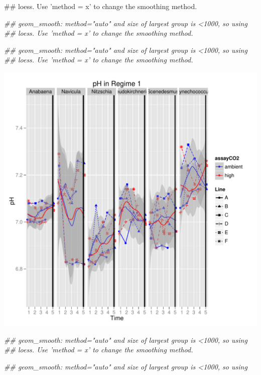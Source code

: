 \documentclass{article}\usepackage{graphicx, color}
\makeatletter
\def\maxwidth{ %
  \ifdim\Gin@nat@width>\linewidth
    \linewidth
  \else
    \Gin@nat@width
  \fi
}
\newenvironment{kframe}{%
 \def\at@end@of@kframe{}%
 \ifinner\ifhmode%
  \def\at@end@of@kframe{\end{minipage}}%
  \begin{minipage}{\columnwidth}%
 \fi\fi%
 \def\FrameCommand##1{\hskip\@totalleftmargin \hskip-\fboxsep
 \colorbox{shadecolor}{##1}\hskip-\fboxsep
     \hskip-\linewidth \hskip-\@totalleftmargin \hskip\columnwidth}%
 \MakeFramed {\advance\hsize-\width
   \@totalleftmargin\z@ \linewidth\hsize
   \@setminipage}}%
 {\par\unskip\endMakeFramed%
 \at@end@of@kframe}
\newenvironment{knitrout}{}{} %
\makeatother
\begin{document}
\begin{knitrout}
\begin{kframe}
\begin{flushleft}
{\#\# loess. Use 'method = x' to change the smoothing method.}\end{flushleft}\begin{flushleft}\ttfamily\noindent\itshape\textcolor{messagecolor}{\#\# geom\_smooth: method="auto" and size of largest group is <1000, so using \\ 
\#\# loess. Use 'method = x' to change the smoothing method.}\end{flushleft}\begin{flushleft}\ttfamily\noindent\itshape\textcolor{messagecolor}{\#\# geom\_smooth: method="auto" and size of largest group is <1000, so using \\ 
\#\# loess. Use 'method = x' to change the smoothing method.}\end{flushleft}\end{kframe}\includegraphics[width=\maxwidth]{figure/physical_parameters_figure2} \begin{kframe}\begin{flushleft}\ttfamily\noindent\itshape\textcolor{messagecolor}{\#\# geom\_smooth: method="auto" and size of largest group is <1000, so using \\ 
\#\# loess. Use 'method = x' to change the smoothing method.}\end{flushleft}\begin{flushleft}\ttfamily\noindent\itshape\textcolor{messagecolor}{\#\# geom\_smooth: method="auto" and size of largest group is <1000, so using \\ 
}
\end{flushleft}
\end{kframe}
\end{knitrout}
\end{document}

